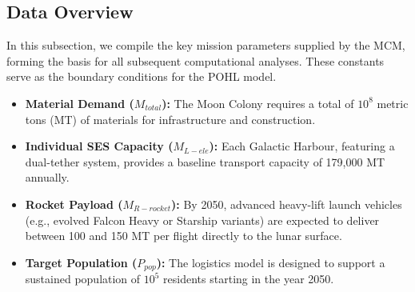 \documentclass{mcmthesis}
\begin{document}
	\subsection{Data Overview}
	In this subsection, we compile the key mission parameters supplied by the MCM, forming the basis for all subsequent computational analyses. These constants serve as the boundary conditions for the POHL model.
	
	\begin{itemize}[leftmargin=*]
		\item \textbf{Material Demand ($M_{total}$):} The Moon Colony requires a total of $10^8$ metric tons (MT) of materials for infrastructure and construction.
		\item \textbf{Individual SES Capacity ($M_{L-ele}$):} Each Galactic Harbour, featuring a dual-tether system, provides a baseline transport capacity of 179,000 MT annually.
		\item \textbf{Rocket Payload ($M_{R-rocket}$):} By 2050, advanced heavy-lift launch vehicles (e.g., evolved Falcon Heavy or Starship variants) are expected to deliver between 100 and 150 MT per flight directly to the lunar surface.
		\item \textbf{Target Population ($P_{pop}$):} The logistics model is designed to support a sustained population of $10^5$ residents starting in the year 2050.
	\end{itemize}
\end{document}
